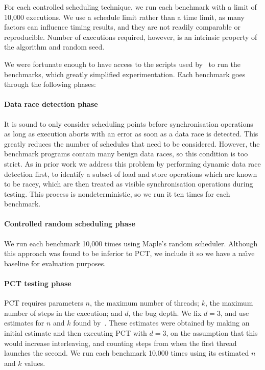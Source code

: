 For each controlled scheduling technique, we run each benchmark with a limit of
10,000 executions.  We use a schedule limit rather than a time limit, as many
factors can influence timing results, and they are not readily comparable or
reproducible.  Number of executions required, however, is an intrinsic property
of the algorithm and random seed.

We were fortunate enough to have access to the scripts used
by~\cite{thomson2016,thomson2014} to run the benchmarks, which greatly
simplified experimentation.  Each benchmark goes through the following phases:

\paragraph{Data race detection phase}
It is sound to only consider scheduling points before synchronisation operations
as long as execution aborts with an error as soon as a data race is
detected\cite{musuvathi2008}.  This greatly reduces the number of schedules that
need to be considered.  However, the benchmark programs contain many benign data
races\cite{thomson2016}, so this condition is too strict.  As in prior
work\cite{thomson2016,thomson2014,yu2012} we address this problem by performing
dynamic data race detection first, to identify a subset of load and store
operations which are known to be racey, which are then treated as visible
synchronisation operations during testing.  This process is nondeterministic, so
we run it ten times for each benchmark.

\paragraph{Controlled random scheduling phase}
We run each benchmark 10,000 times using Maple's random scheduler.  Although
this approach was found to be inferior to PCT\cite{thomson2016}, we include it
so we have a na\"{\i}ve baseline for evaluation purposes.

\paragraph{PCT testing phase}
PCT requires parameters $n$, the maximum number of threads; $k$, the maximum
number of steps in the execution; and $d$, the bug depth.  We fix $d=3$, and use
estimates for $n$ and $k$ found by~\cite{thomson2016}.  These estimates were
obtained by making an initial estimate and then executing PCT with $d=3$, on the
assumption that this would increase interleaving, and counting steps from when
the first thread launches the second.  We run each benchmark 10,000 times using
its estimated $n$ and $k$ values.

